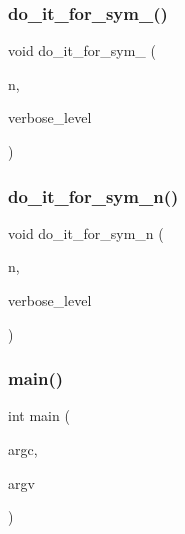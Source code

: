 \subsubsection{\texorpdfstring{do\+\_\+it\+\_\+for\+\_\+sym\+\_()}{do\_it\_for\_sym\_4()}}
{\footnotesize\ttfamily void do\+\_\+it\+\_\+for\+\_\+sym\+\_ (\begin{DoxyParamCaption}\item[{\mbox{\hyperlink{galois_8h_a09fddde158a3a20bd2dcadb609de11dc}{I\+NT}}}]{n,  }\item[{\mbox{\hyperlink{galois_8h_a09fddde158a3a20bd2dcadb609de11dc}{I\+NT}}}]{verbose\+\_\+level }\end{DoxyParamCaption})}

\mbox{\label{group__ring_8_c_a7da1c84aee65e2c8fd4b83f0809835ad}} 
\subsubsection{\texorpdfstring{do\+\_\+it\+\_\+for\+\_\+sym\+\_\+n()}{do\_it\_for\_sym\_n()}}
{\footnotesize\ttfamily void do\+\_\+it\+\_\+for\+\_\+sym\+\_\+n (\begin{DoxyParamCaption}\item[{\mbox{\hyperlink{galois_8h_a09fddde158a3a20bd2dcadb609de11dc}{I\+NT}}}]{n,  }\item[{\mbox{\hyperlink{galois_8h_a09fddde158a3a20bd2dcadb609de11dc}{I\+NT}}}]{verbose\+\_\+level }\end{DoxyParamCaption})}

\mbox{\label{group__ring_8_c_a3c04138a5bfe5d72780bb7e82a18e627}} 
\subsubsection{\texorpdfstring{main()}{main()}}
{\footnotesize\ttfamily int main (\begin{DoxyParamCaption}\item[{int}]{argc,  }\item[{char $\ast$$\ast$}]{argv }\end{DoxyParamCaption})}



